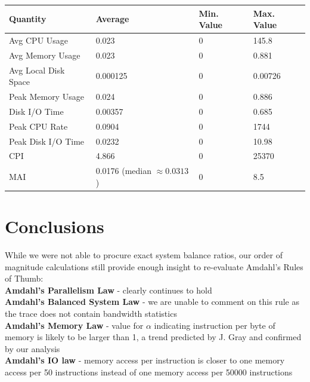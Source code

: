 \documentclass[a0,portrait]{a0poster}
\begin{document}
\begin{multicols}{2}
\begin{center}\vspace{1cm}
\begin{tabular}{| l | l l l |} 
\toprule
\textbf{Quantity} & \textbf{Average} & \textbf{Min. Value} & \textbf{Max. Value} \\
\midrule
Avg CPU Usage & 0.023 & 0 & 145.8 \\ \hline
Avg Memory Usage & 0.023 & 0 & 0.881 \\ \hline
Avg Local Disk Space & 0.000125 & 0 & 0.00726 \\ \hline
Peak Memory Usage & 0.024 & 0 & 0.886 \\ \hline
Disk I/O Time & 0.00357 & 0 & 0.685 \\ \hline
Peak CPU Rate & 0.0904 & 0 & 1744\* \\ \hline
Peak Disk I/O Time & 0.0232 & 0 & 10.98 \\ \hline
CPI & 4.866 & 0 & 25370\* \\ \hline
MAI & 0.0176 (median $\approx 0.0313$) & 0 & 8.5\* \\ \hline
\bottomrule
\end{tabular}
\end{center}\vspace{1cm}




\section*{Conclusions}

While we were not able to procure exact system balance ratios, our order of magnitude calculations still provide enough insight to re-evaluate Amdahl's Rules of Thumb: \\

\noindent \textbf{Amdahl's Parallelism Law} - clearly continues to hold \\
\textbf{Amdahl's Balanced System Law} - we are unable to comment on this rule as the trace does not contain bandwidth statistics\\
\textbf{Amdahl's Memory Law} - value for $\alpha$ indicating instruction per byte of memory is likely to be larger than 1, a trend predicted by J. Gray  and confirmed by our analysis\\
\textbf{Amdahl's IO law} - memory access per instruction is closer to one memory access per 50 instructions instead of one memory access per 50000 instructions \\


\end{multicols}
\end{document}
